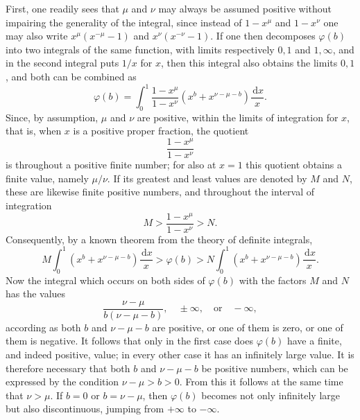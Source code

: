 \documentclass[11pt]{article}
\newcommand{\dd}{\,\mathrm d}
\begin{document}
First, one readily sees that $\mu$ and $\nu$ may always be assumed positive without impairing the generality of the integral, since instead of $1-x^\mu$ and $1-x^\nu$ one may also write $x^\mu(x^{-\mu}-1)$ and $x^\nu(x^{-\nu}-1)$. If one then decomposes $\varphi(b)$ into two integrals of the same function, with limits respectively $0,1$ and $1,\infty$, and in the second integral puts $1/x$ for $x$, then this integral also obtains the limits $0,1$, and both can be combined as
\begin{equation}
\varphi(b)=\int_0^1 \frac{1-x^\mu}{1-x^\nu}\left(x^b+x^{\nu-\mu-b}\right)\frac{\dd x}{x}.
\tag{10}
\end{equation}
Since, by assumption, $\mu$ and $\nu$ are positive, within the limits of integration for $x$, that is, when $x$ is a positive proper fraction, the quotient
\[
\frac{1-x^\mu}{1-x^\nu}
\]
is throughout a positive finite number; for also at $x=1$ this quotient obtains a finite value, namely $\mu/\nu$. If its greatest and least values are denoted by $M$ and $N$, these are likewise finite positive numbers, and throughout the interval of integration
\[
M>\frac{1-x^\mu}{1-x^\nu}>N.
\]
Consequently, by a known theorem from the theory of definite integrals,
\[
M\int_0^1\left(x^b+x^{\nu-\mu-b}\right)\frac{\dd x}{x}
>\varphi(b)>
N\int_0^1\left(x^b+x^{\nu-\mu-b}\right)\frac{\dd x}{x}.
\]
Now the integral which occurs on both sides of $\varphi(b)$ with the factors $M$ and $N$ has the values
\[
\frac{\nu-\mu}{b(\nu-\mu-b)},\quad \pm\infty, \quad\text{or}\quad -\infty,
\]
according as both $b$ and $\nu-\mu-b$ are positive, or one of them is zero, or one of them is negative. It follows that only in the first case does $\varphi(b)$ have a finite, and indeed positive, value; in every other case it has an infinitely large value. It is therefore necessary that both $b$ and $\nu-\mu-b$ be positive numbers, which can be expressed by the condition $\nu-\mu>b>0$. From this it follows at the same time that $\nu>\mu$. If $b=0$ or $b=\nu-\mu$, then $\varphi(b)$ becomes not only infinitely large but also discontinuous, jumping from $+\infty$ to $-\infty$.
\end{document}
